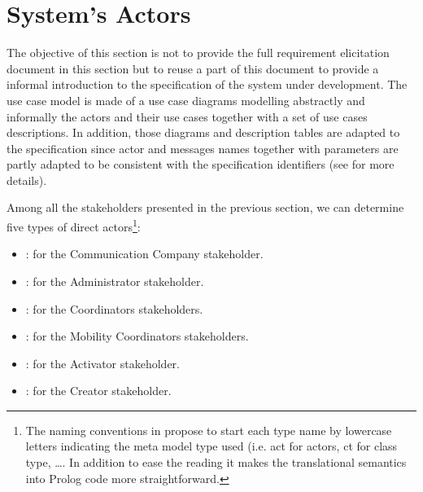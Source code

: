\newpage

\section{System's Actors}
\label{sec:lu.uni.lassy.excalibur.examples.icrash-gendescr-actors}


The objective of this section is not to provide the full requirement elicitation document in this section but to reuse a part of this document to provide a informal introduction to the \msrmessir specification of the system under development. The use case model is made of a use case diagrams modelling abstractly and informally the actors and their use cases together with a set of use cases descriptions. 
In addition, those diagrams and description tables are adapted to the \msrmessir specification since actor and messages names together with parameters are partly adapted to be consistent with the specification identifiers (see \cite{messirbook} for more details). 

Among all the stakeholders presented in the previous section, we can determine five types of \glspl{direct actor}\footnote{The naming conventions in \msrmessir propose to start each type name by lowercase letters indicating the meta model type used (i.e. act for actors, ct for class type, \ldots. In addition to ease the reading it makes the translational semantics into Prolog code more straightforward.}: 
\begin{itemize}
  \item {}: for the Communication Company stakeholder.
  \item {}: for the Administrator stakeholder.
  \item {}: for the Coordinators stakeholders.
  \item {}: for the Mobility Coordinators
  stakeholders.
  \item {}: for the Activator stakeholder.
  \item {}: for the Creator stakeholder.
\end{itemize}
 
